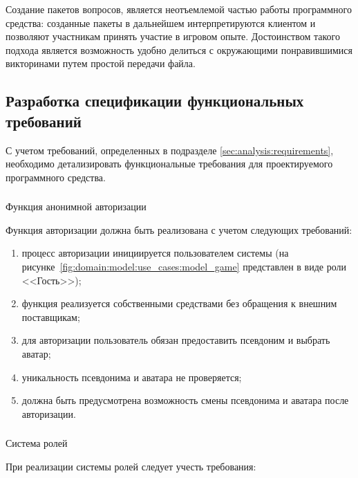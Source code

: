 Создание пакетов вопросов, является неотъемлемой частью работы программного средства: созданные пакеты в дальнейшем интерпретируются клиентом и позволяют участникам принять
участие в игровом опыте. Достоинством такого подхода является возможность удобно делиться с окружающими понравившимися викторинами путем простой передачи файла.

\subsection{Разработка спецификации функциональных требований}
\label{sec:domain:specification}

С учетом требований, определенных в подразделе \ref{sec:analysis:requirements}, необходимо детализировать функциональные требования для проектируемого программного средства.

\subsubsection{} Функция анонимной авторизации
\label{sec:domain:specification:signin}

Функция авторизации должна быть реализована с учетом следующих требований:

\begin{enumerate}
	\item процесс авторизации инициируется пользователем системы (на рисунке~\ref{fig:domain:model:use_cases:model_game} представлен в виде роли <<Гость>>);
	\item функция реализуется собственными средствами без обращения к вне\-ш\-ним поставщикам;
	\item для авторизации пользователь обязан предоставить псевдоним и выбрать аватар;
	\item уникальность псевдонима и аватара не проверяется;
	\item должна быть предусмотрена возможность смены псевдонима и аватара после авторизации.
\end{enumerate}

\subsubsection{} Система ролей
\label{sec:domain:specification:roles}

При реализации системы ролей следует учесть требования:

